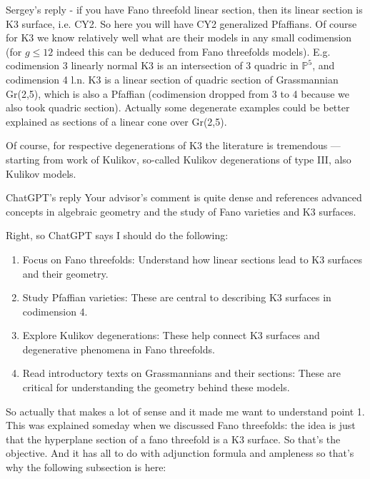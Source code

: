 \begin{thing4}{Sergey's reply} - if you have Fano threefold linear section, then its linear section is K3 surface, i.e. CY2. So here you will have CY2 generalized Pfaffians. Of course for K3 we know relatively well what are their models in any small codimension (for $g\leq 12$  indeed this can be deduced from Fano threefolds models). E.g. codimension 3 linearly normal K3 is an intersection of 3 quadric in $\mathbb{P}^5$, and codimension 4 l.n. K3 is a linear section of quadric section of Grassmannian Gr(2,5), which is also a Pfaffian (codimension dropped from 3 to 4 because we also took quadric section). Actually some degenerate examples could be better explained as sections of a linear cone over Gr(2,5).

	Of course, for respective degenerations of K3 the literature is tremendous — starting from work of Kulikov, so-called Kulikov degenerations of type III, also Kulikov models.
\end{thing4}

\begin{thing8}{ChatGPT's reply}\leavevmode
	Your advisor's comment is quite dense and references advanced concepts in algebraic geometry and the study of Fano varieties and K3 surfaces.
\end{thing8}

Right, so {\color{10}ChatGPT says} I should do the following:

\begin{enumerate}
\item Focus on Fano threefolds: Understand how linear sections lead to K3 surfaces and their geometry.
\item  Study Pfaffian varieties: These are central to describing K3 surfaces in codimension 4.
\item  Explore Kulikov degenerations: These help connect K3 surfaces and degenerative phenomena in Fano threefolds.
\item  Read introductory texts on Grassmannians and their sections: These are critical for understanding the geometry behind these models.
\end{enumerate}

So actually that makes a lot of sense and it made me want to understand point 1. This was explained someday when we discussed Fano threefolds: the idea is just that the hyperplane section of a fano threefold is a K3 surface. So that's the objective. And it has all to do with adjunction formula and ampleness so that's why the following subsection is here:


